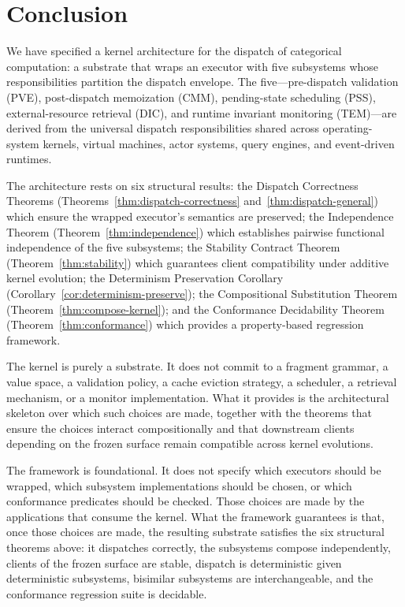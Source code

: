 \documentclass[twocolumn,11pt,a4paper]{article}
\begin{document}
\section{Conclusion}
\label{sec:conclusion}

We have specified a kernel architecture for the dispatch of categorical computation: a substrate that wraps an executor with five subsystems whose responsibilities partition the dispatch envelope. The five---pre-dispatch validation (PVE), post-dispatch memoization (CMM), pending-state scheduling (PSS), external-resource retrieval (DIC), and runtime invariant monitoring (TEM)---are derived from the universal dispatch responsibilities shared across operating-system kernels, virtual machines, actor systems, query engines, and event-driven runtimes.

The architecture rests on six structural results: the Dispatch Correctness Theorems (Theorems~\ref{thm:dispatch-correctness} and~\ref{thm:dispatch-general}) which ensure the wrapped executor's semantics are preserved; the Independence Theorem (Theorem~\ref{thm:independence}) which establishes pairwise functional independence of the five subsystems; the Stability Contract Theorem (Theorem~\ref{thm:stability}) which guarantees client compatibility under additive kernel evolution; the Determinism Preservation Corollary (Corollary~\ref{cor:determinism-preserve}); the Compositional Substitution Theorem (Theorem~\ref{thm:compose-kernel}); and the Conformance Decidability Theorem (Theorem~\ref{thm:conformance}) which provides a property-based regression framework.

The kernel is purely a substrate. It does not commit to a fragment grammar, a value space, a validation policy, a cache eviction strategy, a scheduler, a retrieval mechanism, or a monitor implementation. What it provides is the architectural skeleton over which such choices are made, together with the theorems that ensure the choices interact compositionally and that downstream clients depending on the frozen surface remain compatible across kernel evolutions.

The framework is foundational. It does not specify which executors should be wrapped, which subsystem implementations should be chosen, or which conformance predicates should be checked. Those choices are made by the applications that consume the kernel. What the framework guarantees is that, once those choices are made, the resulting substrate satisfies the six structural theorems above: it dispatches correctly, the subsystems compose independently, clients of the frozen surface are stable, dispatch is deterministic given deterministic subsystems, bisimilar subsystems are interchangeable, and the conformance regression suite is decidable.



\end{document}
